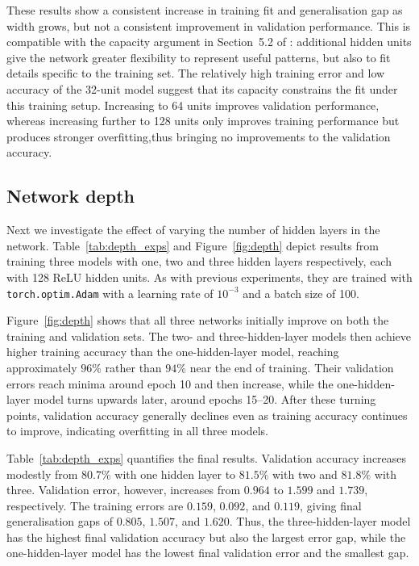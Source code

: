 \documentclass{article}
\begin{document}
These results show a consistent increase in training fit and generalisation gap as width grows, but not a consistent improvement in validation performance.
This is compatible with the capacity argument in Section~5.2 of \citet{Goodfellow-et-al-2016}: additional hidden units give the network greater flexibility to represent useful patterns, but also to fit details specific to the training set.
The relatively high training error and low accuracy of the 32-unit model suggest that its capacity constrains the fit under this training setup.
Increasing to 64 units improves validation performance, whereas increasing further to 128 units only improves training performance but produces stronger overfitting,thus bringing no improvements to the validation accuracy.


\subsection{Network depth}

\questionTableTwo
\questionFigureThree

Next we investigate the effect of varying the number of hidden layers in the network. 
Table~\ref{tab:depth_exps} and Figure~\ref{fig:depth} depict results from training three models with one, two and three hidden layers respectively, each with 128 ReLU hidden units. 
As with previous experiments, they are trained with \texttt{torch.optim.Adam} with a learning rate of $10^{-3}$ and a batch size of 100. 

Figure~\ref{fig:depth} shows that all three networks initially improve on both the training and validation sets.
The two- and three-hidden-layer models then achieve higher training accuracy than the one-hidden-layer model, reaching approximately $96\%$ rather than $94\%$ near the end of training.
Their validation errors reach minima around epoch 10 and then increase, while the one-hidden-layer model turns upwards later, around epochs 15--20.
After these turning points, validation accuracy generally declines even as training accuracy continues to improve, indicating overfitting in all three models.

Table~\ref{tab:depth_exps} quantifies the final results.
Validation accuracy increases modestly from $80.7\%$ with one hidden layer to $81.5\%$ with two and $81.8\%$ with three.
Validation error, however, increases from $0.964$ to $1.599$ and $1.739$, respectively.
The training errors are $0.159$, $0.092$, and $0.119$, giving final generalisation gaps of $0.805$, $1.507$, and $1.620$.
Thus, the three-hidden-layer model has the highest final validation accuracy but also the largest error gap, while the one-hidden-layer model has the lowest final validation error and the smallest gap.
\end{document}
